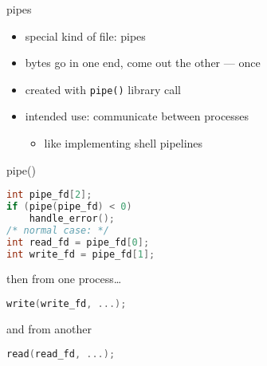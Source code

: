 \begin{frame}{pipes}
\begin{itemize}
\item special kind of file: pipes
\item bytes go in one end, come out the other --- once
\vspace{.5cm}
\item created with \texttt{pipe()} library call
\item intended use: communicate between processes
    \begin{itemize}
    \item like implementing shell pipelines
    \end{itemize}
\end{itemize}
\end{frame}

\begin{frame}[fragile,label=pipe]{pipe()}
\begin{lstlisting}[language=C++,style=small]
int pipe_fd[2];
if (pipe(pipe_fd) < 0)
    handle_error();
/* normal case: */
int read_fd = pipe_fd[0];
int write_fd = pipe_fd[1];
\end{lstlisting}
then from one process\ldots
\begin{lstlisting}[language=C++,style=small]
write(write_fd, ...);
\end{lstlisting}
and from another
\begin{lstlisting}[language=C++,style=small]
read(read_fd, ...);
\end{lstlisting}
\end{frame}


